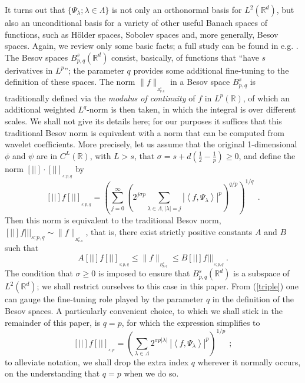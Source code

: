 \documentclass[10pt]{article}
\def\R{\mathbb{R}}
\newcommand\eref[1]{(\ref{#1})}
\def\Vvert{\vert\!\vert\!\vert}
\def\VVert{[\!|\!|\!]}
\begin{document}
It turns out that $\{\Psi_{\lambda}; \lambda \in \Lambda\}$
is not only an orthonormal basis
for $L^2(\R^d)$, but also an unconditional basis for a variety of other
useful
Banach spaces of functions, such
as H\"older spaces, Sobolev spaces and, more generally, Besov spaces.
Again, we review only some basic facts; a full study can be found in e.g.
\cite{Mey92, DeV98, Coh00}.  The Besov spaces $B^s_{p,q}(\R^d)$
consist, basically, of functions that ``have $s$ derivatives in $L^p$'';
the parameter $q$ provides
some additional fine-tuning to the definition of these spaces. The norm
$\|f\|_{_{B^s_{p,q}}}$ in a Besov space $B^s_{p,q}$ is traditionally
defined via the
{\em modulus of continuity} of $f$ in $L^p(\R)$, of which an additional
weighted $L^q$-norm
is then taken, in which the integral is over different scales.
We shall not give its details here; for our purposes it suffices that
this traditional Besov norm is equivalent with a norm that can be computed from
wavelet coefficients. More precisely, let us assume that the original
1-dimensional $\phi$ and
$\psi$ are in $C^L(\R)$, with $L>s$, that
$\sigma=s+d(\frac{1}{2}-\frac{1}{p}) \geq 0$,
and define the norm $\VVert \cdot \VVert_{_{s;p,q}}$ by
\begin{equation}
\label{triple}
\VVert f \VVert  _{_{s;p,q} }= \left( \sum_{j=0}^{\infty} \left(2^{j \sigma
p} \sum_{
\lambda \in \Lambda ,
|\lambda |=j }|\left<f,\Psi_{\lambda}\right>|^p\right)^{q/p}\right)^{1/q} ~~.
\end{equation}
Then this norm is equivalent to the traditional Besov norm,
$\VVert f \Vvert _{s;p,q}\sim\| f \|_{_{B^s_{p,q}}}$, that is, there exist
strictly positive constants $A$ and $B$ such that
\begin{equation}
\label{Besnor}
A \VVert f \VVert_{_{s;p,q}} \leq \| f \| _{_{B^s_{p,q}}}
\leq B \VVert f \Vvert_{_{s;p,q}} ~.
\end{equation}
The condition that $\sigma \geq 0$ is imposed to ensure
that $B^s_{p,q}(\R^d)$ is a subspace
of $L^2(\R^d)$; we shall restrict ourselves to this case in this paper.
From \eref{triple} one can gauge the fine-tuning role played by the
parameter $q$
in the definition of the Besov spaces. A particularly convenient choice, to
which we
shall stick in the remainder of this paper, is $q=p$,
for which the expression simplifies
to
\begin{equation*}
\VVert f \VVert_{_{s,p}} = \left( \sum_{\lambda \in \Lambda} 2^{\sigma
p|\lambda|} ~
| \left< f, \Psi_{\lambda} \right> |^p \right)^{1/p} ~~;
\end{equation*}
to alleviate notation, we shall drop the extra index $q$ wherever it
normally occurs,
on the understanding that $q=p$ when we do so.
\end{document}
